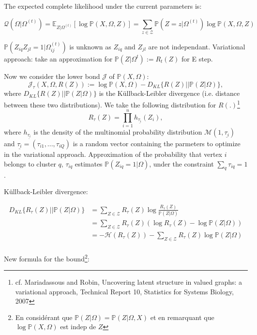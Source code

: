 \documentclass[10pt]{article}
\begin{document}
The expected complete likelihood under the current parameters is:

\[ \mathcal{Q}(\Omega| \Omega^{(t)}) = \mathbb{E}_{Z|\Omega^(t)}[\log \mathbb{P}(X,\Omega, Z)] = \sum_{z\in \mathcal{Z}} \mathbb{P}(Z=z | \Omega^{(t)})\log \mathbb{P}(X,\Omega, Z)\]

$\mathbb{P}(Z_{iq}Z_{jl} = 1 | \Omega_{ij}^{(t)})$ is unknown as $Z_{iq}$ and $Z_{jl}$ are not independant. Variational approach: take an approximation for $\mathbb{P}(Z|\Omega^{t}):= R_t(Z)$ for E step. 

Now we consider the lower bond $\mathcal{J}$ of $\mathbb{P}(X, \Omega)$:
\[ \mathcal{J}_\tau(X, \Omega,  R(Z)) := \log \mathbb{P}(X, \Omega) - D_{KL}\{ R(Z) || \mathbb{P}(Z|\Omega) \}, \]
where $D_{KL}\{ R(Z) || \mathbb{P}(Z|\Omega) \}$ is the Küllback-Leibler divergence (i.e. distance between these two distributions). We take the following distribution for $R(.)$\footnote{cf. Mariadassous and Robin, Uncovering latent structure in valued graphs: a variational approach, Technical Report 10, Statistics for Systems Biology, 2007}
\[ R_\tau (Z) = \prod_{i = 1}^n h_{\underline{\tau_i}}(Z_i), \]
where $h_{\underline{\tau_i}}$ is the density of the multinomial probability distribution $\mathcal{M}(1,\underline{\tau_i})$ and $\underline{\tau_i} = (\tau_{i1}, ..., \tau_{iQ})$ is a random vector containing the parmeters to optimize in the variational approach. Approximation of the probability that vertex $i$ belongs to cluster $q$, $\tau_{iq}$ estimates $\mathbb{P}(Z_{iq} = 1 | \Omega)$, under the constraint $\sum_q \tau_{iq} = 1$ .

Küllback-Leibler divergence:

\begin{align*}
D_{KL}\{ R_\tau(Z) || \mathbb{P}(Z|\Omega) \} &= \sum_{Z \in \mathcal{Z}} R_\tau(Z) \log \frac{R_\tau(Z)}{\mathbb{P}(Z|\Omega)}  \\
&= \sum_{Z \in \mathcal{Z}} R_\tau(Z) \left( \log R_\tau(Z) - \log \mathbb{P}(Z|\Omega) \right) \\
&= -\mathcal{H}(R_\tau (Z)) -  \sum_{Z \in \mathcal{Z}} R_\tau(Z) \log \mathbb{P}(Z|\Omega) \\
\end{align*}

New formula for the bound\footnote{En considérant que $\mathbb{P}(Z|\Omega) = \mathbb{P}(Z|\Omega, X)$ et en remarquant que $\log \mathbb{P}(X,  \Omega)$ est indep de $Z$}: 
\end{document}
